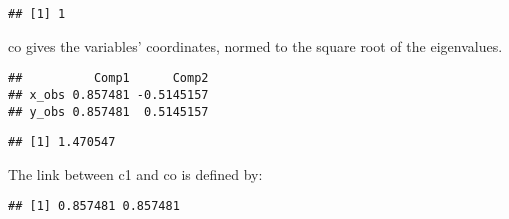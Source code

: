 \documentclass[]{article}
\newenvironment{Shaded}{\begin{snugshade}}{\end{snugshade}}
\newcommand{\KeywordTok}[1]{\textcolor[rgb]{0.13,0.29,0.53}{\textbf{#1}}}
\newcommand{\DecValTok}[1]{\textcolor[rgb]{0.00,0.00,0.81}{#1}}
\newcommand{\StringTok}[1]{\textcolor[rgb]{0.31,0.60,0.02}{#1}}
\newcommand{\OperatorTok}[1]{\textcolor[rgb]{0.81,0.36,0.00}{\textbf{#1}}}
\newcommand{\NormalTok}[1]{#1}
\begin{document}
\begin{Shaded}
\end{Shaded}

\begin{verbatim}
## [1] 1
\end{verbatim}

co gives the variables' coordinates, normed to the square root of the
eigenvalues.

\begin{Shaded}
\end{Shaded}

\begin{verbatim}
##          Comp1      Comp2
## x_obs 0.857481 -0.5145157
## y_obs 0.857481  0.5145157
\end{verbatim}

\begin{Shaded}
\end{Shaded}

\begin{verbatim}
## [1] 1.470547
\end{verbatim}

The link between c1 and co is defined by:

\begin{Shaded}
\end{Shaded}

\begin{verbatim}
## [1] 0.857481 0.857481
\end{verbatim}
\end{document}
